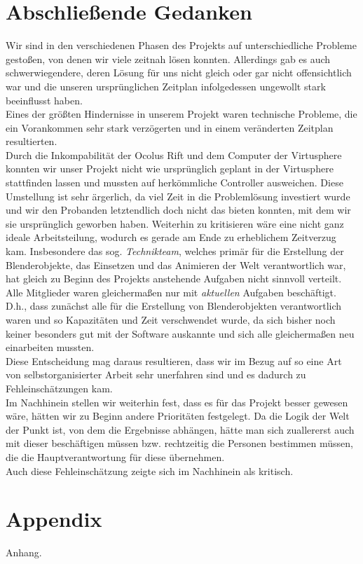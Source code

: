 \documentclass{Bericht}
\begin{document}
\section{Abschließende Gedanken}
	Wir sind in den verschiedenen Phasen des Projekts auf unterschiedliche Probleme gestoßen, von denen wir viele zeitnah lösen konnten. Allerdings gab es auch schwerwiegendere, deren Lösung für uns nicht gleich oder gar nicht offensichtlich war und die unseren ursprünglichen Zeitplan infolgedessen ungewollt stark beeinflusst haben.\\
	Eines der größten Hindernisse in unserem Projekt waren technische Probleme, die ein Vorankommen sehr stark verzögerten und in einem veränderten Zeitplan resultierten.\\
	Durch die Inkompabilität der Ocolus Rift und dem Computer der Virtusphere konnten wir unser Projekt nicht wie ursprünglich geplant in der Virtusphere stattfinden lassen und mussten auf herkömmliche Controller ausweichen. Diese Umstellung ist sehr ärgerlich, da viel Zeit in die Problemlösung investiert wurde und wir den Probanden letztendlich doch nicht das bieten konnten, mit dem wir sie ursprünglich geworben haben. 
	Weiterhin zu kritisieren wäre eine nicht ganz ideale Arbeitsteilung, wodurch es gerade am Ende zu erheblichem Zeitverzug kam. Insbesondere das sog. \textit{Technikteam}, welches primär für die Erstellung der Blenderobjekte, das Einsetzen und das Animieren der Welt verantwortlich war, hat gleich zu Beginn des Projekts anstehende Aufgaben nicht sinnvoll verteilt. Alle Mitglieder waren gleichermaßen nur mit \textit{aktuellen} Aufgaben beschäftigt. D.h., dass zunächst alle für die Erstellung von Blenderobjekten verantwortlich waren und so Kapazitäten und Zeit verschwendet wurde, da sich bisher noch keiner besonders gut mit der Software auskannte und sich alle gleichermaßen neu einarbeiten mussten.\\
	Diese Entscheidung mag daraus resultieren, dass wir im Bezug auf so eine Art von selbstorganisierter Arbeit sehr unerfahren sind und es dadurch zu Fehleinschätzungen kam.\\
	Im Nachhinein stellen wir weiterhin fest, dass es für das Projekt besser gewesen wäre, hätten wir zu Beginn andere Prioritäten festgelegt. Da die Logik der Welt der Punkt ist, von dem die Ergebnisse abhängen, hätte man sich zuallererst auch mit dieser beschäftigen müssen bzw. rechtzeitig die Personen bestimmen müssen, die die Hauptverantwortung für diese übernehmen.\\
	Auch diese Fehleinschätzung zeigte sich im Nachhinein als kritisch.

\section{Appendix} %
	Anhang.
	
\vfill %

\printbibliography
\end{document}
